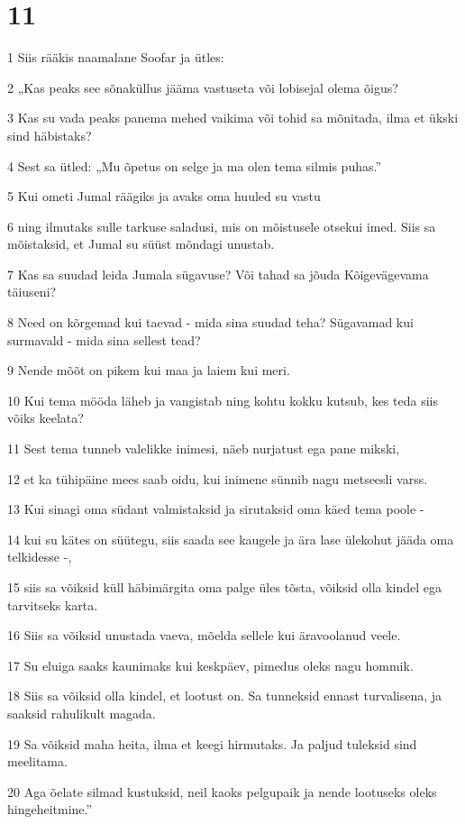 \chapter{11}

\par 1 Siis rääkis naamalane Soofar ja ütles:
\par 2 „Kas peaks see sõnaküllus jääma vastuseta või lobisejal olema õigus?
\par 3 Kas su vada peaks panema mehed vaikima või tohid sa mõnitada, ilma et ükski sind häbistaks?
\par 4 Sest sa ütled: „Mu õpetus on selge ja ma olen tema silmis puhas.”
\par 5 Kui ometi Jumal räägiks ja avaks oma huuled su vastu
\par 6 ning ilmutaks sulle tarkuse saladusi, mis on mõistusele otsekui imed. Siis sa mõistaksid, et Jumal su süüst mõndagi unustab.
\par 7 Kas sa suudad leida Jumala sügavuse? Või tahad sa jõuda Kõigevägevama täiuseni?
\par 8 Need on kõrgemad kui taevad - mida sina suudad teha? Sügavamad kui surmavald - mida sina sellest tead?
\par 9 Nende mõõt on pikem kui maa ja laiem kui meri.
\par 10 Kui tema mööda läheb ja vangistab ning kohtu kokku kutsub, kes teda siis võiks keelata?
\par 11 Sest tema tunneb valelikke inimesi, näeb nurjatust ega pane mikski,
\par 12 et ka tühipäine mees saab oidu, kui inimene sünnib nagu metseesli varss.
\par 13 Kui sinagi oma südant valmistaksid ja sirutaksid oma käed tema poole -
\par 14 kui su kätes on süütegu, siis saada see kaugele ja ära lase ülekohut jääda oma telkidesse -,
\par 15 siis sa võiksid küll häbimärgita oma palge üles tõsta, võiksid olla kindel ega tarvitseks karta.
\par 16 Siis sa võiksid unustada vaeva, mõelda sellele kui äravoolanud veele.
\par 17 Su eluiga saaks kaunimaks kui keskpäev, pimedus oleks nagu hommik.
\par 18 Siis sa võiksid olla kindel, et lootust on. Sa tunneksid ennast turvalisena, ja saaksid rahulikult magada.
\par 19 Sa võiksid maha heita, ilma et keegi hirmutaks. Ja paljud tuleksid sind meelitama.
\par 20 Aga õelate silmad kustuksid, neil kaoks pelgupaik ja nende lootuseks oleks hingeheitmine.”

